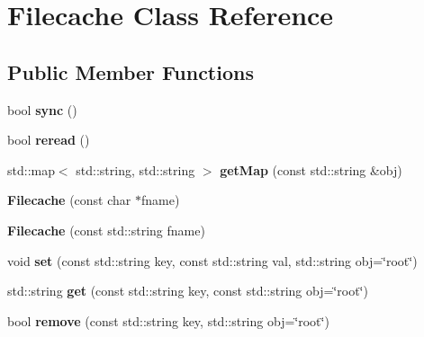 \hypertarget{class_filecache}{}\section{Filecache Class Reference}
\label{class_filecache}
\subsection*{Public Member Functions}
\begin{DoxyCompactItemize}
\item 
bool {\bfseries sync} ()\hypertarget{class_filecache_ad2ac64f2769625980701369f160f863f}{}\label{class_filecache_ad2ac64f2769625980701369f160f863f}

\item 
bool {\bfseries reread} ()\hypertarget{class_filecache_a161a26cb4b9a22bde74a5cfcb628e502}{}\label{class_filecache_a161a26cb4b9a22bde74a5cfcb628e502}

\item 
std\+::map$<$ std\+::string, std\+::string $>$ {\bfseries get\+Map} (const std\+::string \&obj)\hypertarget{class_filecache_a5252d8b1e445fcc28e48d658feb46d20}{}\label{class_filecache_a5252d8b1e445fcc28e48d658feb46d20}

\item 
{\bfseries Filecache} (const char $\ast$fname)\hypertarget{class_filecache_a5cd3c3ec825d8db2ccb816933000dd2b}{}\label{class_filecache_a5cd3c3ec825d8db2ccb816933000dd2b}

\item 
{\bfseries Filecache} (const std\+::string fname)\hypertarget{class_filecache_a6e2b8d9008718c3601420e6ad3e46e0f}{}\label{class_filecache_a6e2b8d9008718c3601420e6ad3e46e0f}

\item 
void {\bfseries set} (const std\+::string key, const std\+::string val, std\+::string obj=\char`\"{}root\char`\"{})\hypertarget{class_filecache_aab5ff0a8dd5b830b625792c5f988e626}{}\label{class_filecache_aab5ff0a8dd5b830b625792c5f988e626}

\item 
std\+::string {\bfseries get} (const std\+::string key, const std\+::string obj=\char`\"{}root\char`\"{})\hypertarget{class_filecache_aa2e2f58a1183201f59022d44e19db017}{}\label{class_filecache_aa2e2f58a1183201f59022d44e19db017}

\item 
bool {\bfseries remove} (const std\+::string key, std\+::string obj=\char`\"{}root\char`\"{})\hypertarget{class_filecache_aa7b0c117e6d3006170f3e648845f55b7}{}\label{class_filecache_aa7b0c117e6d3006170f3e648845f55b7}


\end{DoxyCompactItemize}
